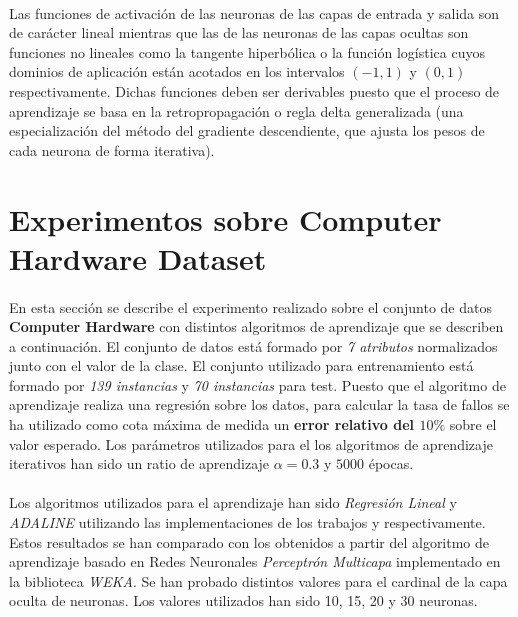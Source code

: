 \documentclass{article}
\begin{document}
			\paragraph{}
			Las funciones de activación de las neuronas de las capas de entrada y salida son de carácter lineal mientras que las de las neuronas de las capas ocultas son funciones no lineales como la tangente hiperbólica o la función logística cuyos dominios de aplicación están acotados en los intervalos $(-1,1)$ y $(0,1)$ respectivamente. Dichas funciones deben ser derivables puesto que el proceso de aprendizaje se basa en la retropropagación o regla delta generalizada (una especialización del método del gradiente descendiente, que ajusta los pesos de cada neurona de forma iterativa).


	\section{Experimentos sobre Computer Hardware Dataset}
	\label{sec:e1}

		\paragraph{}
		En esta sección se describe el experimento realizado sobre el conjunto de datos \textbf{Computer Hardware} \cite{dataset:computer-hardware} con distintos algoritmos de aprendizaje que se describen a continuación. El conjunto de datos está formado por \emph{7 atributos} normalizados junto con el valor de la clase. El conjunto utilizado para entrenamiento está formado por \emph{139 instancias} y \emph{70 instancias} para test. Puesto que el algoritmo de aprendizaje realiza una regresión sobre los datos, para calcular la tasa de fallos se ha utilizado como cota máxima de medida un \textbf{error relativo del $10\%$} sobre el valor esperado. Los parámetros utilizados para el los algoritmos de aprendizaje iterativos han sido un ratio de aprendizaje $\alpha = 0.3$ y $5000$ épocas.

		\paragraph{}
		Los algoritmos utilizados para el aprendizaje han sido \emph{Regresión Lineal} y \emph{ADALINE} utilizando las implementaciones de los trabajos \cite{garciparedes:machine-learning-regression} y \cite{garciparedes:machine-learning-single-layer-neural-networks} respectivamente. Estos resultados se han comparado con los obtenidos a partir del algoritmo de aprendizaje basado en Redes Neuronales \emph{Perceptrón Multicapa} implementado en la biblioteca \emph{WEKA}\cite{tool:weka}. Se han probado distintos valores para el cardinal de la capa oculta de neuronas. Los valores utilizados han sido 10, 15, 20 y 30 neuronas.
\end{document}
